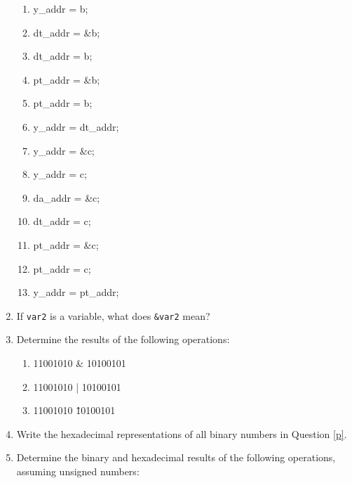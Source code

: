 \begin{enumerate}
\begin{enumerate}
        \item y\_addr = b;
        
        \item dt\_addr = \&b;
        
        \item dt\_addr = b;
        
        \item pt\_addr = \&b;
        
        \item pt\_addr = b;
        
        \item y\_addr = dt\_addr;
        
        \item y\_addr = \&c;
        
        \item y\_addr = c;
        
        \item da\_addr = \&c;
        
        \item dt\_addr = c;
        
        \item pt\_addr = \&c;
        
        \item pt\_addr = c;
        
        \item y\_addr = pt\_addr;
    \end{enumerate}



\item If \texttt{var2} is a variable, what does \texttt{\&var2} mean?


\item \label{p} Determine the results of the following operations:
\begin{enumerate}
\item 11001010 \& 10100101

\item 11001010 | 10100101

\item 11001010 \^ 10100101
\end{enumerate}

\item Write the hexadecimal representations of all binary numbers in Question \ref{p}.

\item Determine the binary and hexadecimal results of the following operations, assuming unsigned numbers: 
\begin{enumerate}


\end{enumerate}
\end{enumerate}
